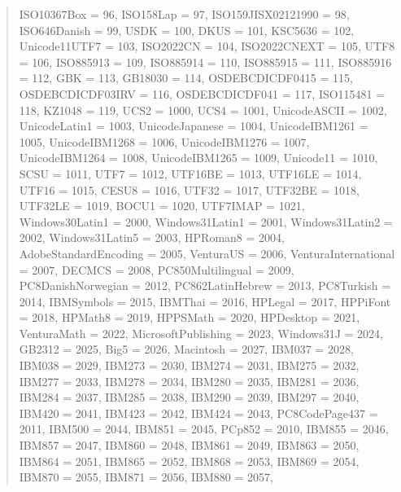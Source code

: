\documentclass{wg21}
\begin{document}
\begin{quote}
\begin{addedblock}
\begin{codeblock}
{{{        ISO10367Box = 96,
        ISO158Lap = 97,
        ISO159JISX02121990 = 98,
        ISO646Danish = 99,
        USDK = 100,
        DKUS = 101,
        KSC5636 = 102,
        Unicode11UTF7 = 103,
        ISO2022CN = 104,
        ISO2022CNEXT = 105,
        UTF8 = 106,
        ISO885913 = 109,
        ISO885914 = 110,
        ISO885915 = 111,
        ISO885916 = 112,
        GBK = 113,
        GB18030 = 114,
        OSDEBCDICDF0415 = 115,
        OSDEBCDICDF03IRV = 116,
        OSDEBCDICDF041 = 117,
        ISO115481 = 118,
        KZ1048 = 119,
        UCS2 = 1000,
        UCS4 = 1001,
        UnicodeASCII = 1002,
        UnicodeLatin1 = 1003,
        UnicodeJapanese = 1004,
        UnicodeIBM1261 = 1005,
        UnicodeIBM1268 = 1006,
        UnicodeIBM1276 = 1007,
        UnicodeIBM1264 = 1008,
        UnicodeIBM1265 = 1009,
        Unicode11 = 1010,
        SCSU = 1011,
        UTF7 = 1012,
        UTF16BE = 1013,
        UTF16LE = 1014,
        UTF16 = 1015,
        CESU8 = 1016,
        UTF32 = 1017,
        UTF32BE = 1018,
        UTF32LE = 1019,
        BOCU1 = 1020,
        UTF7IMAP = 1021,
        Windows30Latin1 = 2000,
        Windows31Latin1 = 2001,
        Windows31Latin2 = 2002,
        Windows31Latin5 = 2003,
        HPRoman8 = 2004,
        AdobeStandardEncoding = 2005,
        VenturaUS = 2006,
        VenturaInternational = 2007,
        DECMCS = 2008,
        PC850Multilingual = 2009,
        PC8DanishNorwegian = 2012,
        PC862LatinHebrew = 2013,
        PC8Turkish = 2014,
        IBMSymbols = 2015,
        IBMThai = 2016,
        HPLegal = 2017,
        HPPiFont = 2018,
        HPMath8 = 2019,
        HPPSMath = 2020,
        HPDesktop = 2021,
        VenturaMath = 2022,
        MicrosoftPublishing = 2023,
        Windows31J = 2024,
        GB2312 = 2025,
        Big5 = 2026,
        Macintosh = 2027,
        IBM037 = 2028,
        IBM038 = 2029,
        IBM273 = 2030,
        IBM274 = 2031,
        IBM275 = 2032,
        IBM277 = 2033,
        IBM278 = 2034,
        IBM280 = 2035,
        IBM281 = 2036,
        IBM284 = 2037,
        IBM285 = 2038,
        IBM290 = 2039,
        IBM297 = 2040,
        IBM420 = 2041,
        IBM423 = 2042,
        IBM424 = 2043,
        PC8CodePage437 = 2011,
        IBM500 = 2044,
        IBM851 = 2045,
        PCp852 = 2010,
        IBM855 = 2046,
        IBM857 = 2047,
        IBM860 = 2048,
        IBM861 = 2049,
        IBM863 = 2050,
        IBM864 = 2051,
        IBM865 = 2052,
        IBM868 = 2053,
        IBM869 = 2054,
        IBM870 = 2055,
        IBM871 = 2056,
        IBM880 = 2057,
}}}
\end{codeblock}
\end{addedblock}
\end{quote}
\end{document}

